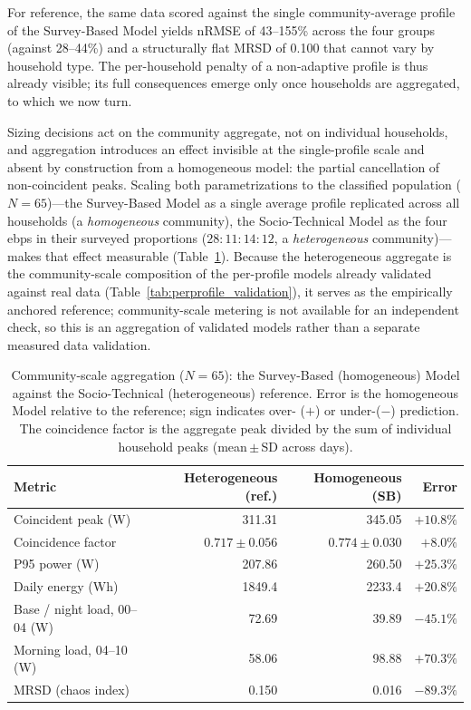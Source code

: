 \documentclass[final,3p,times,onecolumn]{elsarticle}
\begin{document}
For reference, the same data scored against the single community-average profile of the Survey-Based Model yields nRMSE of 43--155\% across the four groups (against 28--44\%) and a structurally flat MRSD of 0.100 that cannot vary by household type. The per-household penalty of a non-adaptive profile is thus already visible; its full consequences emerge only once households are aggregated, to which we now turn.

Sizing decisions act on the community aggregate, not on individual households, and aggregation introduces an effect invisible at the single-profile scale and absent by construction from a homogeneous model: the partial cancellation of non-coincident peaks. Scaling both parametrizations to the classified population ($N=65$)---the Survey-Based Model as a single average profile replicated across all households (a \emph{homogeneous} community), the Socio-Technical Model as the four \glspl{ebp} in their surveyed proportions ($28{:}11{:}14{:}12$, a \emph{heterogeneous} community)---makes that effect measurable (Table~\ref{tab:community_validation}). Because the heterogeneous aggregate is the community-scale composition of the per-profile models already validated against real data (Table~\ref{tab:perprofile_validation}), it serves as the empirically anchored reference; community-scale metering is not available for an independent check, so this is an aggregation of validated models rather than a separate measured data validation.

\begin{table}[H]
\centering
\caption{Community-scale aggregation ($N=65$): the Survey-Based (homogeneous) Model against the Socio-Technical (heterogeneous) reference. Error is the homogeneous Model relative to the reference; sign indicates over- ($+$) or under-($-$) prediction. The coincidence factor is the aggregate peak divided by the sum of individual household peaks (mean\,$\pm$\,SD across days).}
\label{tab:community_validation}
\begin{tabular}{lrrr}
\toprule
Metric & Heterogeneous (ref.) & Homogeneous (SB) & Error \\
\midrule
Coincident peak (W)            & 311.31 & 345.05 & $+10.8\%$ \\
Coincidence factor             & $0.717 \pm 0.056$ & $0.774 \pm 0.030$ & $+8.0\%$ \\
P95 power (W)                  & 207.86 & 260.50 & $+25.3\%$ \\
Daily energy (Wh)              & 1849.4 & 2233.4 & $+20.8\%$ \\
Base / night load, 00--04 (W)  & 72.69  & 39.89  & $-45.1\%$ \\
Morning load, 04--10 (W)       & 58.06  & 98.88  & $+70.3\%$ \\
MRSD (chaos index)             & 0.150  & 0.016  & $-89.3\%$ \\
\bottomrule
\end{tabular}
\end{table}
\end{document}

